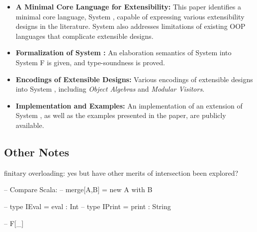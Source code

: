 \begin{itemize}

\item {\bf A Minimal Core Language for Extensibility:} This paper
  identifies a minimal core language, System \name, capable of
  expressing various extensibility designs in the literature.
  System \name also addresses limitations of existing OOP
  languages that complicate extensible designs. 
  
\item {\bf Formalization of System \name:} An elaboration semantics of
  System \name into System F is given, and type-soundness is proved.

\item {\bf Encodings of Extensible Designs:} Various encodings of
  extensible designs into System \name, including \emph{Object
    Algebras} and \emph{Modular Visitors}. 

\item {\bf Implementation and Examples:} An implementation of an
  extension of System \name, as well as the examples presented in the
  paper, are publicly available. 

\begin{comment}

\item{elaboration typing rules which given a source expression with intersection
    types, typecheck and translate it into an ordinary F term. Prove a type
    preservation result: if a term $ e $ has type $ \ty $ in the source language,
    then the translated term $ \image e $ is well-typed and has type $ \image \ty $ in the
    target language.}

\item{present an algorithm for detecting incoherence which can be very important
    in practice.}

\item{explores the connection between intersection types and object algebra by
    showing various examples of encoding object algebra with intersection
    types.}

\end{comment}

\end{itemize}

\subsection{Other Notes}

finitary overloading: yes
but have other merits of intersection been explored?

-- Compare Scala:
-- merge[A,B] = new A with B

-- type IEval  = { eval :  Int }
-- type IPrint = { print : String }

-- F[\_]
